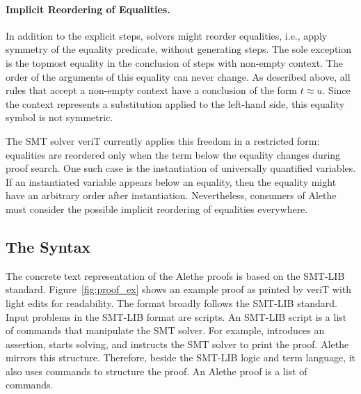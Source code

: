 \documentclass{scrartcl}
\newcommand\smtlib{SMT-LIB}
\newcommand\tool[1]{\textsf{#1}}
\newcommand\verit{\tool{veriT}}
\theoremstyle{definition}
\begin{document}
\paragraph{Implicit Reordering of Equalities.}
In addition to the explicit steps, solvers might reorder equalities,
i.e., apply symmetry of the equality predicate, without generating steps.
The sole exception is the topmost equality in the conclusion of steps
with non-empty context.  The order of the arguments of this equality can
never change.
As described above, all rules that accept a non-empty context have
a conclusion of the form $t ≈ u$.  Since the context
represents a substitution applied to the left-hand side,
this equality symbol is not symmetric.

The SMT solver {\verit} currently applies this freedom in a restricted
form: equalities are reordered only
when the term below the equality changes during proof search. One such
case is the instantiation of universally quantified variables. If an
instantiated variable appears below an equality, then the equality might
have an arbitrary order after instantiation.
Nevertheless, consumers of Alethe must consider the possible
implicit reordering of equalities everywhere.


\subsection{The Syntax}\label{sec:alethe:syntax}

The concrete text representation of the Alethe proofs
is based on the {\smtlib} standard. Figure~\ref{fig:proof_ex} shows an
example proof as printed by {\verit} with light edits for readability.
%
The format broadly follows the {\smtlib} standard.
%
Input problems in the {\smtlib} format are scripts.  An {\smtlib} script
is a list of commands that manipulate the SMT solver.  For example,
 introduces an assertion,  starts
solving, and  instructs the SMT solver to print the
proof.
%
Alethe mirrors this structure. Therefore, beside the {\smtlib}
logic and term language, it also uses commands to structure the proof.
An Alethe proof is a list of commands.
\end{document}
